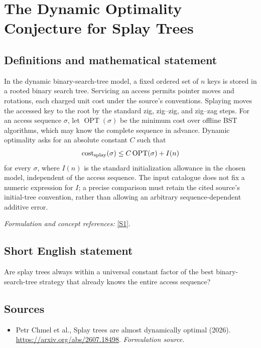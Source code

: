 \documentclass[11pt]{article}
\begin{document}
\section*{\texorpdfstring{The Dynamic Optimality Conjecture for Splay Trees}{The Dynamic Optimality Conjecture for Splay Trees}}\label{30006848}
\subsection{Definitions and mathematical statement}
In the dynamic binary-search-tree model, a fixed ordered set of $n$ keys is stored in a rooted binary search tree. Servicing an access permits pointer moves and rotations, each charged unit cost under the source's conventions. Splaying moves the accessed key to the root by the standard zig, zig--zig, and zig--zag steps. For an access sequence $\sigma$, let $\operatorname{OPT}(\sigma)$ be the minimum cost over offline BST algorithms, which may know the complete sequence in advance. Dynamic optimality asks for an absolute constant $C$ such that
\[
 \operatorname{cost}_{\rm splay}(\sigma)
 \le C\operatorname{OPT}(\sigma)+I(n)
\]
for every $\sigma$, where $I(n)$ is the standard initialization allowance in the chosen model, independent of the access sequence. The input catalogue does not fix a numeric expression for $I$; a precise comparison must retain the cited source's initial-tree convention, rather than allowing an arbitrary sequence-dependent additive error.
\par\smallskip\textit{Formulation and concept references:} \href{https://arxiv.org/abs/2607.18498}{[S1]}.

\subsection{Short English statement}
Are splay trees always within a universal constant factor of the best binary-search-tree strategy that already knows the entire access sequence?
\subsection{Sources}
\begin{itemize}
\item[S1]Petr Chmel et al., Splay trees are almost dynamically optimal (2026).
\url{https://arxiv.org/abs/2607.18498}.
\textit{Formulation source.}
\end{itemize}
\end{document}
